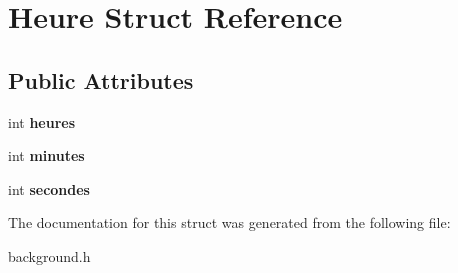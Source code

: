\hypertarget{structHeure}{}\section{Heure Struct Reference}
\label{structHeure}
\subsection*{Public Attributes}
\begin{DoxyCompactItemize}
\item 
\mbox{\label{structHeure_ae49d0f4a02685669f717f1617b564a57}} 
int {\bfseries heures}
\item 
\mbox{\label{structHeure_add82a2eaf354bbe3872ca4387f222295}} 
int {\bfseries minutes}
\item 
\mbox{\label{structHeure_ad0d5caf9f781db4389b8514d5ecffbd3}} 
int {\bfseries secondes}
\end{DoxyCompactItemize}


The documentation for this struct was generated from the following file\+:\begin{DoxyCompactItemize}
\item 
background.\+h\end{DoxyCompactItemize}
